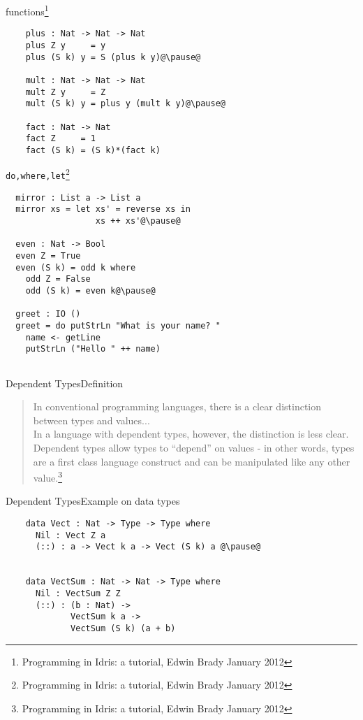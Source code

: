 \documentclass[rail]{beamer}
\begin{document}
\begin{frame}[fragile]{\idris}
  {functions\footnote[frame,1]
    {Programming in Idris: a tutorial, Edwin Brady January 2012}}
  \begin{lstlisting}
    plus : Nat -> Nat -> Nat
    plus Z y     = y
    plus (S k) y = S (plus k y)@\pause@

    mult : Nat -> Nat -> Nat
    mult Z y     = Z
    mult (S k) y = plus y (mult k y)@\pause@

    fact : Nat -> Nat
    fact Z     = 1
    fact (S k) = (S k)*(fact k)
  \end{lstlisting}
\end{frame}

\begin{frame}[fragile]{\idris}
  {\texttt{do,where,let}\footnote[frame,1]
    {Programming in Idris: a tutorial, Edwin Brady January 2012}}
\begin{lstlisting}
  mirror : List a -> List a
  mirror xs = let xs' = reverse xs in
                  xs ++ xs'@\pause@

  even : Nat -> Bool
  even Z = True
  even (S k) = odd k where
    odd Z = False
    odd (S k) = even k@\pause@

  greet : IO ()
  greet = do putStrLn "What is your name? "
    name <- getLine
    putStrLn ("Hello " ++ name)


\end{lstlisting}
\end{frame}

\begin{frame}{Dependent Types}{Definition}
  \begin{quotation}
    In conventional programming languages, there is a clear
    distinction between types and values... \\
    In a language with dependent types, however, the distinction is
    less clear. Dependent types allow types to ``depend'' on values -
    in other words, types are a first class language construct and can
    be manipulated like any other value.\footnote[frame,1]
    {Programming in Idris: a tutorial, Edwin Brady January 2012}
  \end{quotation}
\end{frame}

\begin{frame}[fragile]{Dependent Types}{Example on data types}
  \begin{lstlisting}
    data Vect : Nat -> Type -> Type where
      Nil : Vect Z a
      (::) : a -> Vect k a -> Vect (S k) a @\pause@


    data VectSum : Nat -> Nat -> Type where
      Nil : VectSum Z Z
      (::) : (b : Nat) ->
             VectSum k a ->
             VectSum (S k) (a + b)
    \end{lstlisting}
\end{frame}
\end{document}
